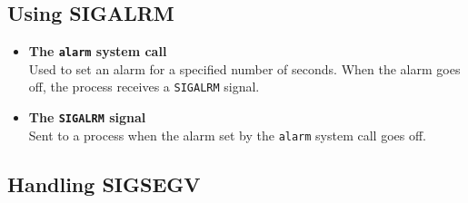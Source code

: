 \documentclass{assignment}
\begin{document}
\subsection{Using SIGALRM}
\begin{itemize}
    \item \textbf{The \verb|alarm| system call}\\
    Used to set an alarm for a specified number of seconds. When the alarm goes off, the process receives a \verb|SIGALRM| signal.
    \item \textbf{The \verb|SIGALRM| signal}\\
    Sent to a process when the alarm set by the \verb|alarm| system call goes off.
\end{itemize}



\subsection{Handling SIGSEGV}

\end{document}
